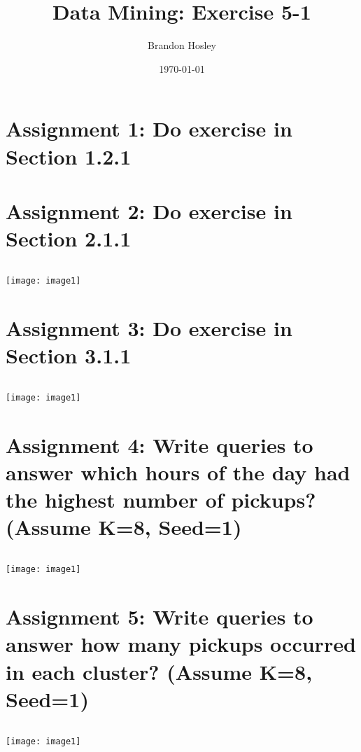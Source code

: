 \documentclass[]{article}
\title{Data Mining: Exercise 5-1}
\author{Brandon Hosley}
\date{\today}
\begin{document}
\maketitle

\section*{Assignment 1: Do exercise in Section 1.2.1}

\section*{Assignment 2: Do exercise in Section 2.1.1}

\begin{verbatim}

\end{verbatim}
\texttt{[image: image1]}


\section*{Assignment 3: Do exercise in Section 3.1.1}

\begin{verbatim}

\end{verbatim}
\texttt{[image: image1]}


\section*{Assignment 4: Write queries to answer which hours of the day had the highest number of pickups? (Assume K=8, Seed=1)}

\begin{verbatim}

\end{verbatim}
\texttt{[image: image1]}

\section*{Assignment 5: Write queries to answer how many pickups occurred in each cluster? (Assume K=8, Seed=1)}

\begin{verbatim}

\end{verbatim}
\texttt{[image: image1]}
\end{document}
